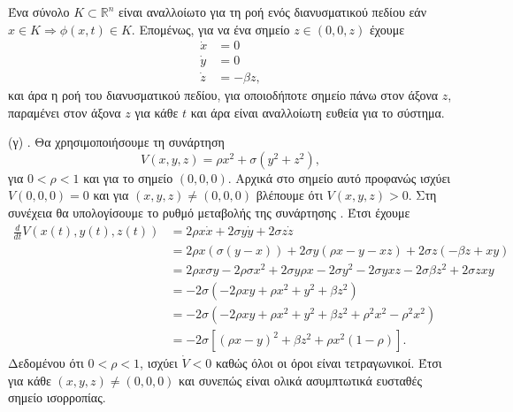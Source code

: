 \begin{solution}
    Ένα σύνολο \( K \subset \mathbb{R}^n \) είναι αναλλοίωτο για τη ροή ενός
    διανυσματικού πεδίου εάν \( x \in K \Rightarrow \phi(x, t) \in K \).
    Επομένως, για να ένα σημείο \( z \in (0, 0, z) \) έχουμε
    \begin{align*}
        \dot{x} &= 0 \\
        \dot{y} &= 0 \\
        \dot{z} &= -\beta z,
    \end{align*}
    και άρα η ροή του διανυσματικού πεδίου, για οποιοδήποτε σημείο πάνω στον
    άξονα \( z \), παραμένει στον άξονα \( z \) για κάθε \( t \) και άρα είναι
    αναλλοίωτη ευθεία για το σύστημα.

    (γ) . Θα χρησιμοποιήσουμε τη συνάρτηση 
    \begin{equation*}
        V(x, y, z) = \rho x^2 + \sigma(y^2 + z^2),
    \end{equation*}
    για \( 0 < \rho < 1 \) και για το σημείο \( (0, 0, 0) \). Αρχικά στο σημείο
    αυτό προφανώς ισχύει \( V(0, 0, 0) = 0 \) και για \( (x, y, z) \neq (0, 0,
    0) \) βλέπουμε ότι \( V(x, y, z) > 0 \). Στη συνέχεια θα υπολογίσουμε το
    ρυθμό μεταβολής της συνάρτησης . Έτσι έχουμε
    \begin{align*}
        \frac{d}{dt}V(x(t), y(t), z(t))
        &= 2\rho x \dot{x} + 2\sigma y \dot{y} + 2 \sigma z \dot{z} \\
        &= 2\rho x (\sigma(y - x)) + 2\sigma y (\rho x - y - xz) + 2 \sigma z
        (-\beta z + xy) \\
        &= 2\rho x\sigma y - 2\rho\sigma x^2 + 2\sigma y\rho x - 2\sigma y^2 -
        2\sigma yxz - 2 \sigma\beta z^2 + 2\sigma zxy \\
        &= -2\sigma \left( -2\rho xy + \rho x^2 + y^2 + \beta z^2 \right) \\
        &= -2\sigma \left( -2\rho xy + \rho x^2 + y^2 + \beta z^2 + \rho^2 x^2 -
        \rho^2x^2\right) \\
        &= -2\sigma \left[ {(\rho x - y)}^2 + \beta z^2 + \rho x^2(1 -
        \rho)\right].
    \end{align*}
    Δεδομένου ότι \( 0 < \rho < 1 \), ισχύει \( \dot{V} < 0 \) καθώς όλοι οι
    όροι είναι τετραγωνικοί. Έτσι για κάθε \( (x, y, z) \neq (0, 0, 0) \) και
    συνεπώς είναι ολικά ασυμπτωτικά ευσταθές σημείο ισορροπίας.
\end{solution}
